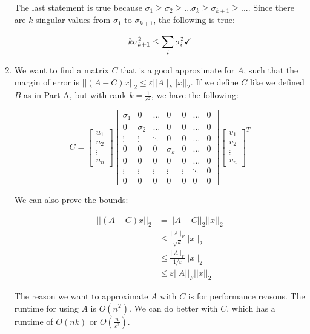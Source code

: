\documentclass[11pt]{article}
\theoremstyle{definition}
\theoremstyle{case}
\theoremstyle{theorem}
\begin{document}
\begin{enumerate}[label=(\alph*)]
The last statement is true because $\sigma_1 \geq \sigma_2 \geq ... \sigma_k \geq \sigma_{k+1} \geq ...$. 
Since there are $k$ singular values from $\sigma_1$ to $\sigma_{k+1}$, the following is true:

\[
  k \sigma_{k+1}^2 \leq \sum_i \sigma_i^2 \text{\checkmark}
\]

\newpage

\item We want to find a matrix $C$ that is a good approximate for $A$, such that the margin of error
is $||(A - C)x||_2 \leq \varepsilon ||A||_F ||x||_2$. If we define $C$ like we defined $B$ as in Part A,
but with rank $k = \frac{1}{\varepsilon^2}$, we have the following:

\[
  C = 
  \begin{bmatrix}
    u_1 \\
    u_2 \\
    \vdots \\
    u_n
  \end{bmatrix} 
  \left[
    \begin{array}{ccccccc}
      \sigma_1 & 0        & \hdots & 0        & 0      & \hdots  & 0 \\
      0        & \sigma_2 & \hdots & 0        & 0      & \hdots  & 0 \\
      \vdots   & \vdots   & \ddots & 0        & 0      & \hdots  & 0 \\
      0        & 0        & 0      & \sigma_k & 0      & \hdots  & 0 \\
      0        & 0        & 0      & 0        & 0      & \hdots  & 0 \\
      \vdots   & \vdots   & \vdots & \vdots   & \vdots & \ddots  & 0 \\
      0        & 0        & 0      & 0        & 0      & 0       & 0 
    \end{array}
  \right]
  \begin{bmatrix}
    v_1 \\
    v_2 \\
    \vdots \\
    v_n
  \end{bmatrix}^T
\]

We can also prove the bounds:

\begin{align*}
||(A - C)x||_2 &= ||A - C||_2 ||x||_2 \\
               &\leq \frac{||A||_F}{\sqrt{k}} ||x||_2 \\
               &\leq \frac{||A||_F}{1/\varepsilon} ||x||_2 \\
               &\leq \varepsilon ||A||_F ||x||_2
\end{align*}

The reason we want to approximate $A$ with $C$ is for performance reasons. The runtime for using $A$ is
$O(n^2)$. We can do better with $C$, which has a runtime of $O(nk)$ or $O(\frac{n}{\varepsilon^2})$.

\end{enumerate}
\end{document}
